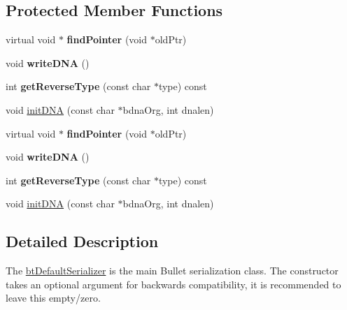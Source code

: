 \subsection*{Protected Member Functions}
\begin{DoxyCompactItemize}
\item 
\mbox{\label{classbtDefaultSerializer_ada5d81efe7b786486e11f85da05813a6}} 
virtual void $\ast$ {\bfseries find\+Pointer} (void $\ast$old\+Ptr)
\item 
\mbox{\label{classbtDefaultSerializer_aab13df5728b1880e0a96cf833811985c}} 
void {\bfseries write\+D\+NA} ()
\item 
\mbox{\label{classbtDefaultSerializer_a4f64d7e10c5f709b8b0ea42efb63532f}} 
int {\bfseries get\+Reverse\+Type} (const char $\ast$type) const
\item 
void \hyperlink{classbtDefaultSerializer_a086b9ce0a49cb08de90528644bfe9d83}{init\+D\+NA} (const char $\ast$bdna\+Org, int dnalen)
\item 
\mbox{\label{classbtDefaultSerializer_ada5d81efe7b786486e11f85da05813a6}} 
virtual void $\ast$ {\bfseries find\+Pointer} (void $\ast$old\+Ptr)
\item 
\mbox{\label{classbtDefaultSerializer_aab13df5728b1880e0a96cf833811985c}} 
void {\bfseries write\+D\+NA} ()
\item 
\mbox{\label{classbtDefaultSerializer_a4f64d7e10c5f709b8b0ea42efb63532f}} 
int {\bfseries get\+Reverse\+Type} (const char $\ast$type) const
\item 
void \hyperlink{classbtDefaultSerializer_a086b9ce0a49cb08de90528644bfe9d83}{init\+D\+NA} (const char $\ast$bdna\+Org, int dnalen)
\end{DoxyCompactItemize}


\subsection{Detailed Description}
The \hyperlink{classbtDefaultSerializer}{bt\+Default\+Serializer} is the main Bullet serialization class. The constructor takes an optional argument for backwards compatibility, it is recommended to leave this empty/zero. 

